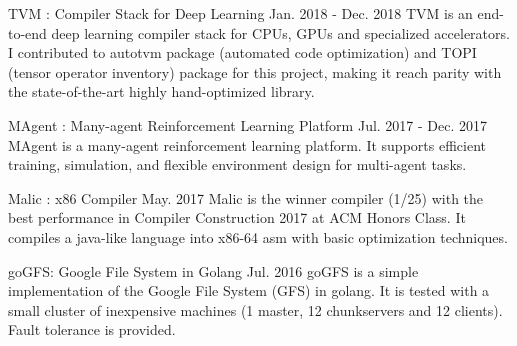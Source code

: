 

\begin{cventries}

  \cventry
    {} %
	{TVM : Compiler Stack for Deep Learning } %
	{Jan. 2018 - Dec. 2018} %
	{} %
	{
		TVM is an end-to-end deep learning compiler stack for CPUs, GPUs and specialized accelerators. I contributed to autotvm package (automated code optimization) and TOPI (tensor operator inventory) package for this project, making it reach parity with the state-of-the-art highly hand-optimized library.
	}

  \cventry
	{} %
	{MAgent : Many-agent Reinforcement Learning Platform } %
	{Jul. 2017 - Dec. 2017} %
	{} %
	{
		MAgent is a many-agent reinforcement learning platform. It supports efficient training, simulation, and flexible environment design for multi-agent tasks.
	}	


  \cventry
    {} %
    {Malic : x86 Compiler
    	 	} %
    {May. 2017} %
    {} %
    {
      Malic is the winner compiler (1/25) with the best performance in Compiler Construction 2017 at ACM Honors Class. It compiles a java-like language into x86-64 asm with basic optimization techniques.
    }

  \cventry
    {} %
    {goGFS: Google File System in Golang } %
    {Jul. 2016} %
    {} %
    {
        goGFS is a simple implementation of the Google File System (GFS) in golang.
        It is tested with a small cluster of inexpensive machines (1 master, 12 chunkservers and 12 clients).
        Fault tolerance is provided.
    }

\end{cventries}
